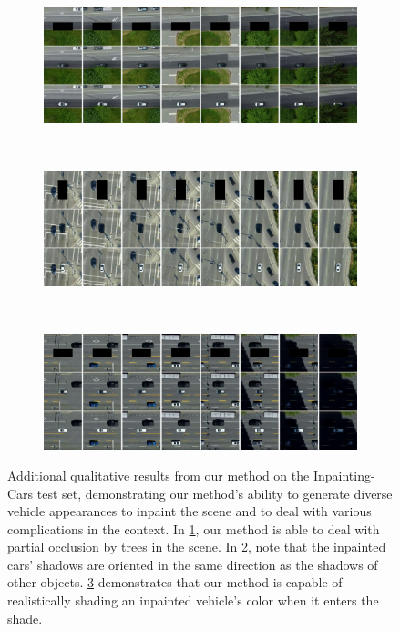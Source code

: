 \begin{figure}[t!]
    \centering
    \begin{subfigure}[t]{\textwidth}
        \centering
        \includegraphics[width=\textwidth]{figures/additional-samples/cars_3028.pdf}
        \caption{}
        \label{fig:extra-cars1}
    \end{subfigure}
    ~
    \begin{subfigure}[t]{\textwidth}
        \centering
        \includegraphics[width=\textwidth]{figures/additional-samples/cars_3067.pdf}
        \caption{}
        \label{fig:extra-cars2}
    \end{subfigure}
    ~
    \begin{subfigure}[t]{\textwidth}
        \centering
        \includegraphics[width=\textwidth]{figures/additional-samples/cars_3093.pdf}
        \caption{}
        \label{fig:extra-cars3}
    \end{subfigure}%
    \caption{Additional qualitative results from our method on the Inpainting-Cars test set, demonstrating our method's ability to generate diverse vehicle appearances to inpaint the scene and to deal with various complications in the context.  In \cref{fig:extra-cars1}, our method is able to deal with partial occlusion by trees in the scene. In \cref{fig:extra-cars2}, note that the inpainted cars' shadows are oriented in the same direction as the shadows of other objects. \cref{fig:extra-cars3} demonstrates that our method is capable of realistically shading an inpainted vehicle's color when it enters the shade.
    }
    \label{fig:extra-cars}
\end{figure}
